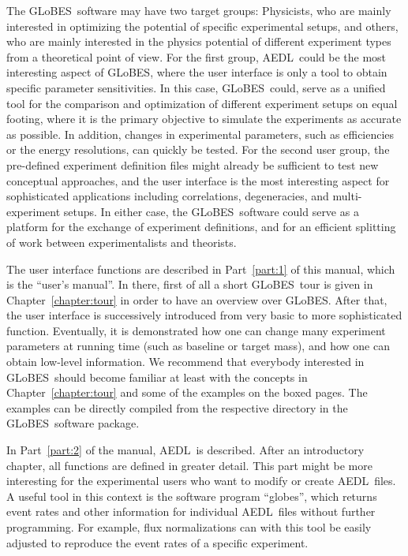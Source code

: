 \documentclass[a4paper,12pt,twoside]{book}
\newcommand{\Chapt}{Chapter}
\newcommand{\Part}{Part}
\newcommand{\GLOBES}{{\sf GLoBES}}
\newcommand{\AEDL}{{\sf AEDL}}
\begin{document}
The \GLOBES\ software may have two target groups: 
Physicists, who are mainly interested in optimizing the potential
of specific experimental setups, and others, who are mainly
interested in the physics potential of different experiment types
from a theoretical point of view.
For the first group, \AEDL\ could be the most interesting aspect of
\GLOBES , where the user interface is only a tool to obtain specific
parameter sensitivities. In this case, \GLOBES\ could, serve as a
unified tool for the comparison and optimization of different experiment
 setups on equal footing, where
it is the primary objective to simulate the experiments as accurate
as possible. In addition, changes in experimental parameters, such as
efficiencies or the energy resolutions, can quickly be tested.
%
For the second user group, the pre-defined 
experiment definition files might already be sufficient to test
new conceptual approaches, and the user interface is the most interesting
aspect for sophisticated applications including correlations,
degeneracies, and multi-experiment setups. In either case, the \GLOBES\
software could serve as a platform for the exchange of experiment
definitions, and for an efficient splitting of work between
experimentalists and theorists.

The user interface functions are described in \Part~\ref{part:1} of 
this manual, which is the ``user's manual''. In there, first of all a 
short \GLOBES\ tour is given in \Chapt~\ref{chapter:tour} in order to 
have an overview over \GLOBES . 
After that, the user
interface is successively introduced from very basic to more sophisticated
function. Eventually, it is demonstrated how one can change many
experiment parameters at running time (such as baseline or target mass), and how one can obtain low-level
information. We recommend that everybody interested in \GLOBES\ should
become familiar at least with the concepts in \Chapt~\ref{chapter:tour}
 and some of the examples on the boxed pages. The examples can be 
 directly compiled 
 from the respective directory in the \GLOBES\ software package.

In \Part~\ref{part:2} of the manual, \AEDL\ is described. After an
introductory chapter, all functions are defined in greater detail.
This part might be more interesting for the experimental users who
want to modify or create \AEDL\ files. A useful tool in this context
is the software program ``globes'', which returns event rates and other
information for individual \AEDL\ files without further programming. 
For example, flux normalizations can with this tool be easily adjusted 
to reproduce the event rates of a specific experiment.
\end{document}
